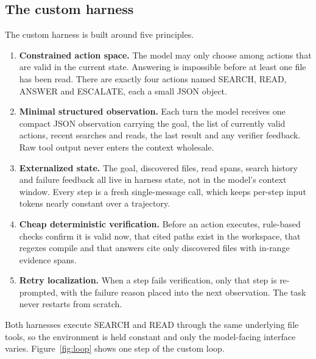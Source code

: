 \documentclass[11pt]{article}
\begin{document}
\subsection{The custom harness}

The custom harness is built around five principles.

\begin{enumerate}
  \item \textbf{Constrained action space.} The model may only choose among
        actions that are valid in the current state. Answering is impossible
        before at least one file has been read. There are exactly four actions
        named SEARCH, READ, ANSWER and ESCALATE, each a small JSON object.
  \item \textbf{Minimal structured observation.} Each turn the model receives
        one compact JSON observation carrying the goal, the list of currently
        valid actions, recent searches and reads, the last result and any
        verifier feedback. Raw tool output never enters the context wholesale.
  \item \textbf{Externalized state.} The goal, discovered files, read spans,
        search history and failure feedback all live in harness state, not in
        the model's context window. Every step is a fresh single-message call,
        which keeps per-step input tokens nearly constant over a trajectory.
  \item \textbf{Cheap deterministic verification.} Before an action executes,
        rule-based checks confirm it is valid now, that cited paths exist in
        the workspace, that regexes compile and that answers cite only
        discovered files with in-range evidence spans.
  \item \textbf{Retry localization.} When a step fails verification, only that
        step is re-prompted, with the failure reason placed into the next
        observation. The task never restarts from scratch.
\end{enumerate}

Both harnesses execute SEARCH and READ through the same underlying file
tools, so the environment is held constant and only the model-facing
interface varies. Figure~\ref{fig:loop} shows one step of the custom loop.
\end{document}
